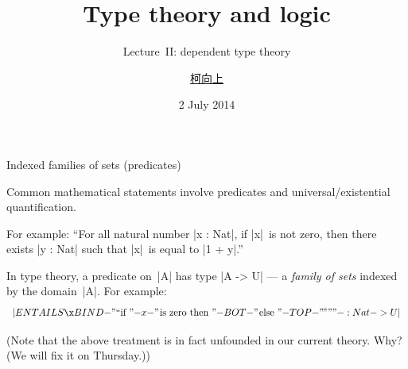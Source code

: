 \documentclass[t,compress,hyperref={hidelinks}]{beamer}
\newcommand{\lectureno}{II}
\begin{document}

\title{Type theory and logic}
\subtitle{Lecture~\lectureno: dependent type theory}
\date{2 July 2014}
\author{{\href{http://www.cs.ox.ac.uk/people/hsiang-shang.ko/}{柯向上}}}

{
\begin{frame}
\titlepage
\end{frame}}

\begin{frame}{Indexed families of sets (predicates)}

Common mathematical statements involve predicates and universal/existential quantification.

For example: ``For all natural number |x : Nat|, if |x|~is not zero, then there exists |y : Nat| such that |x|~is equal to |1 + y|.''

In type theory, a predicate on~|A| has type |A -> U| --- a \emph{family of sets} indexed by the domain~|A|.
For example:
\[ |ENTAILS \x BIND {-"\text{``if }"-} x {-"\text{\kern1pt is zero then }"-} BOT {-"\text{\kern1pt else }"-} TOP {-"\text{\kern-.1em''''}"-} : Nat -> U| \]

(Note that the above treatment is in fact unfounded in our current theory. Why? (We will fix it on Thursday.))

\end{frame}
\end{document}
